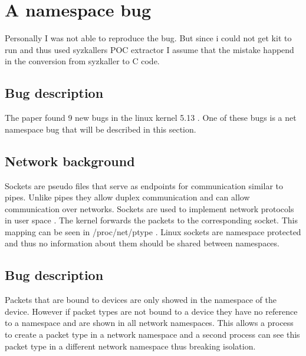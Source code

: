 \documentclass[10pt,twocolumn,a4paper]{article}
\begin{document}
\section{A namespace bug}\label{sec:bug}
Personally I was not able to reproduce the bug. But
since i could not get kit to run and thus used syzkallers POC extractor I assume that the mistake
happend in the conversion from syzkaller to C code\cite{0}.
\subsection{Bug description}
The paper found 9 new bugs in the linux kernel 5.13 \cite{0}. One of these bugs is a net namespace
bug that will be described in this section. 
\subsection{Network background}
Sockets are pseudo files that serve as endpoints for communication similar to pipes. Unlike pipes
they allow duplex communication and can allow communication over networks\cite{5}. Sockets are
used to implement network protocols in user space \cite{5}. The kernel forwards the packets to the
corresponding socket. This mapping can be seen in /proc/net/ptype \cite{6}. Linux sockets are
namespace protected and thus no information about them should be shared between namespaces.

\subsection{Bug description}
Packets that are bound to devices are only showed in the namespace of the device. However if packet
types are not bound to a device they have no reference to a namespace and are shown in all network
namespaces. This allows a process to create a packet type in a network namespace and a second
process can see this packet type in a different network namespace thus breaking isolation.
\end{document}
